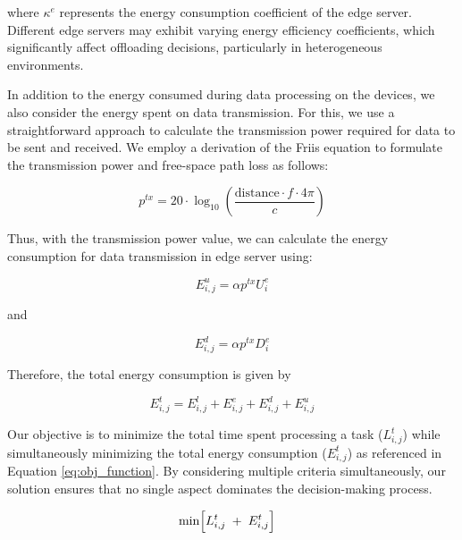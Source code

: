 \documentclass[iicol]{sn-jnl}
\begin{document}
where $\kappa^e$ represents the energy consumption coefficient of the edge server. Different edge servers may exhibit varying energy efficiency coefficients, which significantly affect offloading decisions, particularly in heterogeneous environments.

In addition to the energy consumed during data processing on the devices, we also consider the energy spent on data transmission. For this, we use a straightforward approach to calculate the transmission power required for data to be sent and received. We employ a derivation of the Friis equation to formulate the transmission power and free-space path loss \cite{friis1946note} as follows:

\begin{equation}
p^{tx} = 20 \cdot \log_{10} \left( \frac{\text{distance} \cdot f \cdot 4 \pi}{c} \right)
\end{equation}

Thus, with the transmission power value, we can calculate the energy consumption for data transmission in edge server using:

\begin{equation}
\label{eq_dt_energy_up}
E_{i,j}^{u}=\alpha p^{tx}U_{i}^{e}
\end{equation}

and

\begin{equation}
    \label{eq_dt_energy_down}
    E_{i,j}^{d}=\alpha p^{tx}D_{i}^{e}
\end{equation}

Therefore, the total energy consumption is given by

\begin{equation}
E_{i,j}^{t}=E_{i,j}^{l}+E_{i,j}^{e}+E_{i,j}^{d}+E_{i,j}^{u}
\end{equation}

Our objective is to minimize the total time spent processing a task ($L_{i,j}^t$) while simultaneously minimizing the total energy consumption ($E_{i,j}^t$) as referenced in Equation \eqref{eq:obj_function}. By considering multiple criteria simultaneously, our solution ensures that no single aspect dominates the decision-making process.

\begin{equation}
    \begin{aligned}
    & \min
    \Bigl[
        L_{i,j}^t
        \;+\;
        E_{i,j}^t
    \Bigr]
    \end{aligned}
    \label{eq:obj_function}
\end{equation}
\end{document}
